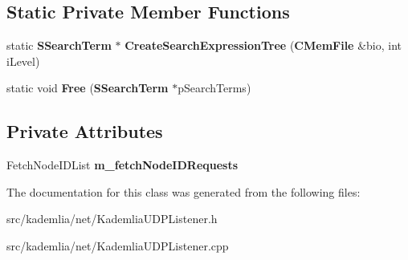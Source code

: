 \subsection*{Static Private Member Functions}
\begin{DoxyCompactItemize}
\item 
static {\bf SSearchTerm} $\ast$ {\bfseries CreateSearchExpressionTree} ({\bf CMemFile} \&bio, int iLevel)\label{classKademlia_1_1CKademliaUDPListener_a5facaabffe2142ef1c1f1791df1ea063}

\item 
static void {\bfseries Free} ({\bf SSearchTerm} $\ast$pSearchTerms)\label{classKademlia_1_1CKademliaUDPListener_ab3b4776a29ecb01500e6a1002bd02bf7}

\end{DoxyCompactItemize}
\subsection*{Private Attributes}
\begin{DoxyCompactItemize}
\item 
FetchNodeIDList {\bfseries m\_\-fetchNodeIDRequests}\label{classKademlia_1_1CKademliaUDPListener_a2dac61ff2d3077bdcce8faa3fd610c9f}

\end{DoxyCompactItemize}


The documentation for this class was generated from the following files:\begin{DoxyCompactItemize}
\item 
src/kademlia/net/KademliaUDPListener.h\item 
src/kademlia/net/KademliaUDPListener.cpp\end{DoxyCompactItemize}
